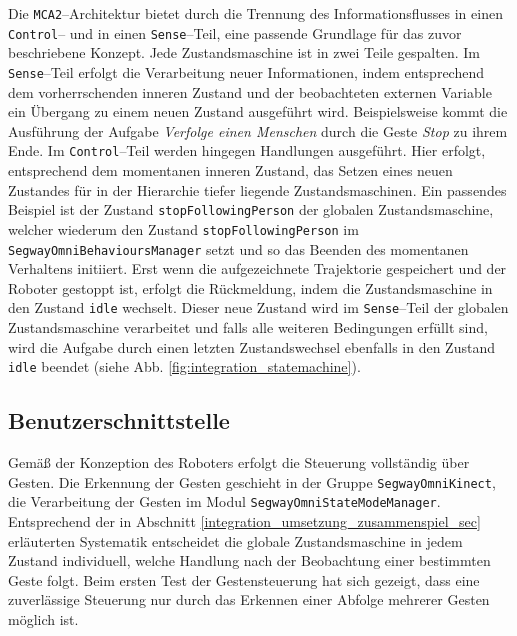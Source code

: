 Die \lstinline{MCA2}--Architektur bietet durch die Trennung des Informationsflusses in 
einen \lstinline{Control}-- und in einen \lstinline{Sense}--Teil, eine passende Grundlage für das zuvor beschriebene Konzept.
Jede Zustandsmaschine ist in zwei Teile gespalten.
Im \lstinline{Sense}--Teil erfolgt die Verarbeitung neuer Informationen, indem entsprechend dem vorherrschenden inneren Zustand und der beobachteten externen Variable ein Übergang zu einem neuen Zustand ausgeführt wird.
Beispielsweise kommt die Ausführung der Aufgabe \textit{Verfolge einen Menschen} durch die Geste \textit{Stop} zu ihrem Ende.
Im \lstinline{Control}--Teil werden hingegen Handlungen ausgeführt.
Hier erfolgt, entsprechend dem momentanen inneren Zustand, \zB das Setzen eines neuen Zustandes für in der Hierarchie tiefer liegende Zustandsmaschinen.
Ein passendes Beispiel ist der Zustand \lstinline{stopFollowingPerson} der
globalen Zustandsmaschine, welcher wiederum den Zustand \lstinline{stopFollowingPerson} im
\lstinline{SegwayOmniBehavioursManager} setzt und so das Beenden des momentanen Verhaltens initiiert.
Erst wenn die aufgezeichnete Trajektorie gespeichert und der Roboter gestoppt ist, erfolgt die Rückmeldung, indem die Zustandsmaschine in den Zustand \lstinline{idle} wechselt.
Dieser neue Zustand wird im \lstinline{Sense}--Teil der globalen Zustandsmaschine verarbeitet und falls alle weiteren Bedingungen erfüllt sind, wird die Aufgabe durch einen letzten Zustandswechsel ebenfalls in den Zustand \lstinline{idle} beendet (siehe Abb. \ref{fig:integration_statemachine}).


\subsection{Benutzerschnittstelle}
\label{benutzerschnittstelle_integration_cha}

Gemäß der Konzeption des Roboters erfolgt die Steuerung vollständig über Gesten.
Die Erkennung der Gesten geschieht in der Gruppe \lstinline{SegwayOmniKinect}, die Verarbeitung der Gesten im Modul \lstinline{SegwayOmniStateModeManager}.
Entsprechend der in Abschnitt \ref{integration_umsetzung_zusammenspiel_sec} erläuterten Systematik entscheidet die globale Zustandsmaschine in jedem Zustand individuell, welche Handlung nach der Beobachtung einer bestimmten Geste folgt.
Beim ersten Test der Gestensteuerung hat sich gezeigt, dass eine zuverlässige Steuerung nur durch das Erkennen einer Abfolge mehrerer Gesten möglich ist.

